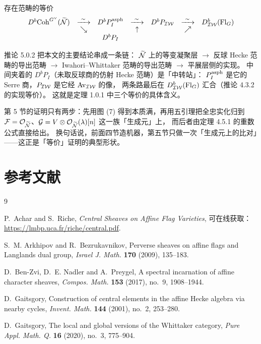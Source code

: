 \begin{corollary}\label{cor:five}
存在范畴的等价
\[
\begin{array}{ccccccc}
D^b\Coh^{G^\vee}(\tN) & \xrightarrow{\ \sim\ } & D^b\Pasph
  & \xrightarrow{\ \sim\ } & D^b\PIW & \xrightarrow{\ \sim\ } & D^b_{\IW}(\Fl_G)\\[-0.2em]
 & \searrow & & \uparrow & & \nearrow & \\
 & & \multicolumn{1}{c}{D^bP_I} & & & &
\end{array}
\]
\end{corollary}

\begin{yizhu}
推论 5.0.2 把本文的主要结论串成一条链：
$\widetilde{\mathcal{N}}$ 上的等变凝聚层 $\to$ 反球 Hecke 范畴的导出范畴 $\to$ Iwahori–Whittaker 范畴的导出范畴 $\to$ 平展层侧的实现。
中间夹着的 $D^bP_I$（未取反球商的仿射 Hecke 范畴）是「中转站」：
$P_I^{\mathrm{asph}}$ 是它的 Serre 商，$P_{\mathcal{IW}}$ 是它经 $\mathrm{Av}_{\mathcal{IW}}$ 的像，
两条路最后在 $D^b_{\mathcal{IW}}(\mathrm{Fl}_G)$ 汇合（推论 4.3.2 的实现等价）。
这就是定理 1.0.1 中三个等价的具体含义。
\end{yizhu}

\begin{keytakeaways}
第 5 节的证明只有两步：先用图 (7) 得到本质满，再用五引理把全忠实化归到
$\mathcal{F}=\mathcal{O}_{\widetilde{\mathcal{N}}}$、$\mathcal{G}=V\otimes\mathcal{O}_{\widetilde{\mathcal{N}}}(\lambda)[n]$ 这一族「生成元」上，
而后者由定理 4.5.1 的重数公式直接给出。
换句话说，前面四节造机器，第五节只做一次「生成元上的比对」——这正是「等价」证明的典型形状。
\end{keytakeaways}

\section*{参考文献}

\begin{thebibliography}{9}
\small

P.~Achar and S.~Riche,
\emph{Central Sheaves on Affine Flag Varieties},
可在线获取：\url{https://lmbp.uca.fr/riche/central.pdf}.

S.~M. Arkhipov and R.~Bezrukavnikov,
Perverse sheaves on affine flags and Langlands dual group,
\emph{Israel J. Math.} \textbf{170} (2009), 135--183.

D.~Ben-Zvi, D.~E. Nadler and A.~Preygel,
A spectral incarnation of affine character sheaves,
\emph{Compos. Math.} \textbf{153} (2017), no.~9, 1908--1944.

D.~Gaitsgory,
Construction of central elements in the affine Hecke algebra via nearby cycles,
\emph{Invent. Math.} \textbf{144} (2001), no.~2, 253--280.

D.~Gaitsgory,
The local and global versions of the Whittaker category,
\emph{Pure Appl. Math. Q.} \textbf{16} (2020), no.~3, 775--904.

\end{thebibliography}

